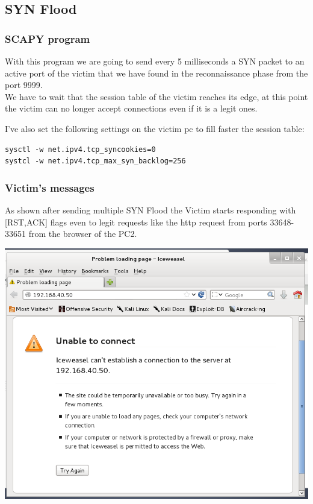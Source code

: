 \subsection{SYN Flood}
\subsubsection{SCAPY program}

With this program we are going to send every 5 milliseconds a SYN packet to an active port of the victim that we have found in the reconnaissance phase from the port 9999.\\
We have to wait that the session table of the victim reaches its edge, at this point the victim can no longer accept connections even if it is a legit ones.\par
I’ve also set the following settings on the victim pc to fill faster the session table:\\
\begin{lstlisting}
sysctl -w net.ipv4.tcp_syncookies=0
systcl -w net.ipv4.tcp_max_syn_backlog=256
\end{lstlisting}

\subsubsection{Victim's messages}



As shown after sending multiple SYN Flood the Victim starts responding with [RST,ACK] flags even to legit requests like the http request from ports 33648-33651 from the browser of the PC2.\par
\medskip
\includegraphics[width=16cm]{img/SYNFloodResult.png}\par

